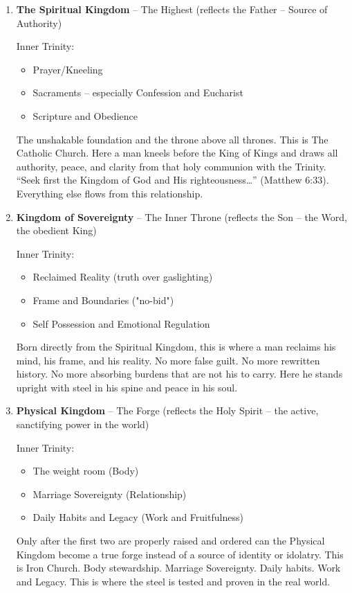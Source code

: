 \documentclass[12pt,a4paper]{book}
\begin{document}
\begin{enumerate}
\item \textbf{The Spiritual Kingdom}  -- The Highest (reflects the Father -- Source of Authority)

Inner Trinity:

\begin{itemize}
\item Prayer/Kneeling
\item Sacraments -- especially Confession and Eucharist
\item Scripture and Obedience
\end{itemize}

The unshakable foundation and the throne above all thrones.  This is The Catholic Church.  Here a man kneels before the King of Kings and draws all authority,  peace,  and clarity from that holy communion with the Trinity.   “Seek first the Kingdom of God and His righteousness…” (Matthew 6:33). Everything else flows from this relationship.

\item \textbf{Kingdom of Sovereignty} -- The Inner Throne (reflects the Son -- the Word, the obedient King)

Inner Trinity:

\begin{itemize}
\item Reclaimed Reality (truth over gaslighting)

\item Frame and Boundaries ("no-bid")

\item Self Possession and Emotional Regulation
\end{itemize}

Born directly from the Spiritual Kingdom, this is where a man reclaims his mind, his frame, and his reality.   No more false guilt.   No more rewritten history.   No more absorbing burdens that are not his to carry.   Here he stands upright with steel in his spine and peace in his soul.

\item \textbf{Physical Kingdom} -- The Forge (reflects the Holy Spirit -- the active, sanctifying power in the world)

Inner Trinity:

\begin{itemize}
\item The weight room (Body)
\item Marriage Sovereignty (Relationship)
\item Daily Habits and Legacy (Work and Fruitfulness)
\end{itemize}

Only after the first two are properly raised and ordered can the Physical Kingdom become a true forge instead of a source of identity or idolatry. This is Iron Church.   Body stewardship.  Marriage Sovereignty.  Daily habits.  Work and Legacy.   This is where the steel is tested and proven in the real world.

\end{enumerate}
\end{document}
